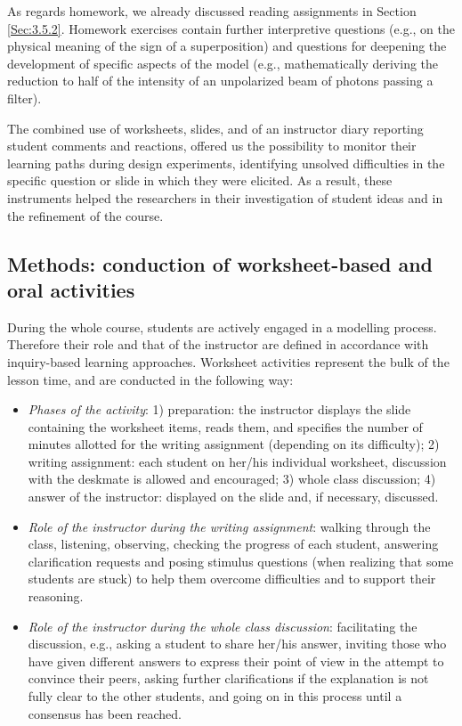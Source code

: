 \documentclass[twocolumn,secnumarabic,amssymb, nobibnotes, aps, prd, nofootinbib]{revtex4-2}
\begin{document}
As regards homework, we already discussed reading assignments in Section \ref{Sec:3.5.2}. Homework exercises contain further interpretive questions (e.g., on the physical meaning of the sign of a superposition) and questions for deepening the development of specific aspects of the model (e.g., mathematically deriving the reduction to half of the intensity of an unpolarized beam of photons passing a filter).

The combined use of worksheets, slides, and of an instructor diary reporting student comments and reactions, offered us the possibility to monitor their learning paths during design experiments, identifying unsolved difficulties in the specific question or slide in which they were elicited. As a result, these instruments helped the researchers in their investigation of student ideas and in the refinement of the course.


\subsection{Methods: conduction of worksheet-based and oral activities} \label{Sec:4.3}
During the whole course, students are actively engaged in a modelling process. Therefore their role and that of the instructor are defined in accordance with inquiry-based learning approaches. Worksheet activities represent the bulk of the lesson time, and are conducted in the following way:
\begin{itemize}
    \item \textit{Phases of the activity}: 1) preparation: the instructor displays the slide containing the worksheet items, reads them, and specifies the number of minutes allotted for the writing assignment (depending on its difficulty); 2) writing assignment: each student on her/his individual worksheet, discussion with the deskmate is allowed and encouraged; 3) whole class discussion; 4) answer of the instructor: displayed on the slide and, if necessary, discussed.
    \item \textit{Role of the instructor during the writing assignment}: walking through the class, listening, observing, checking the progress of each student, answering clarification requests and posing stimulus questions (when realizing that some students are stuck) to help them overcome difficulties and to support their reasoning.
    \item \textit{Role of the instructor during the whole class discussion}: facilitating the discussion, e.g., asking a student to share her/his answer, inviting those who have given different answers to express their point of view in the attempt to convince their peers, asking further clarifications if the explanation is not fully clear to the other students, and going on in this process until a consensus has been reached.
\end{itemize}
\end{document}
